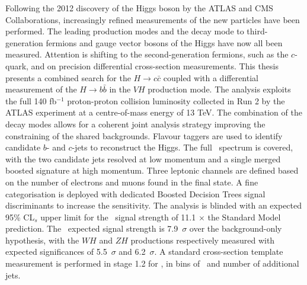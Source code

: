Following the 2012 discovery of the Higgs boson by the ATLAS and CMS Collaborations, increasingly refined measurements of the new particles have been performed. The leading production modes and the decay mode to third-generation fermions and gauge vector bosons of the Higgs have now all been measured. Attention is shifting to the second-generation fermions, such as the $c$-quark, and on precision differential cross-section measurements. This thesis presents a combined search for the $H \rightarrow c\bar{c}$ coupled with a differential measurement of the $H \rightarrow b\bar{b}$ in the $VH$ production mode. The analysis exploits the full 140 fb$^{-1}$ proton-proton collision luminosity collected in Run 2 by the ATLAS experiment at a centre-of-mass energy of 13 TeV. The combination of the decay modes allows for a coherent joint analysis strategy improving the constraining of the shared backgrounds. Flavour taggers are used to identify candidate $b$- and $c$-jets to reconstruct the Higgs. The full \pt\ spectrum is covered, with the two candidate jets resolved at low momentum and a single merged boosted signature at high momentum. Three leptonic channels are defined based on the number of electrons and muons found in the final state. A fine categorisation is deployed with dedicated Boosted Decision Trees signal discriminants to increase the sensitivity. The analysis is blinded with an expected 95\% CL$_s$ upper limit for the \vhc\ signal strength of 11.1 $\times$ the Standard Model prediction. The \vhb\ expected signal strength is 7.9~$\sigma$ over the background-only hypothesis, with the $WH$ and $ZH$ productions respectively measured with expected significances of 5.5~$\sigma$ and 6.2~$\sigma$. A standard cross-section template measurement is performed in stage 1.2 for \vhb, in bins of \pt\ and number of additional jets.
\vspace*{\fill}
    